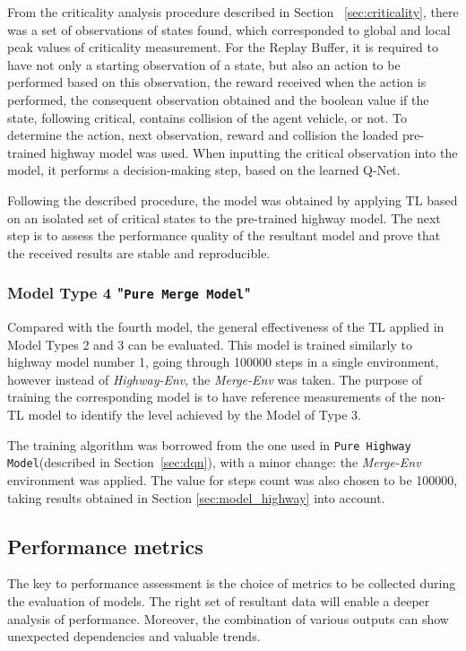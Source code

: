 From the criticality analysis procedure described in Section ~\ref{sec:criticality}, there was a set of observations of states found, which corresponded to global and local peak values of criticality measurement. For the Replay Buffer, it is required to have not only a starting observation of a state, but also an action to be performed based on this observation, the reward received when the action is performed, the consequent observation obtained and the boolean value if the state, following critical, contains collision of the agent vehicle, or not. To determine the action, next observation, reward and collision the loaded pre-trained highway model was used. When inputting the critical observation into the model, it performs a decision-making step, based on the learned Q-Net. 

Following the described procedure, the model was obtained by applying TL based on an isolated set of critical states to the pre-trained highway model. The next step is to assess the performance quality of the resultant model and prove that the received results are stable and reproducible.

\subsubsection{Model Type 4 "\texttt{Pure Merge Model}"}

Compared with the fourth model, the general effectiveness of the TL applied in Model Types 2 and 3 can be evaluated. This model is trained similarly to highway model number 1, going through 100000 steps in a single environment, however instead of \emph{Highway-Env}, the \emph{Merge-Env} was taken. The purpose of training the corresponding model is to have reference measurements of the non-TL model to identify the level achieved by the Model of Type 3.

The training algorithm was borrowed from the one used in \texttt{Pure Highway Model}(described in Section~\ref{sec:dqn}), with a minor change: the \emph{Merge-Env} environment was applied. The value for steps count was also chosen to be 100000, taking results obtained in Section \ref{sec:model_highway} into account.

\subsection{Performance metrics}\label{sec:performance_metrics}

The key to performance assessment is the choice of metrics to be collected during the evaluation of models. The right set of resultant data will enable a deeper analysis of performance. Moreover, the combination of various outputs can show unexpected dependencies and valuable trends. 

